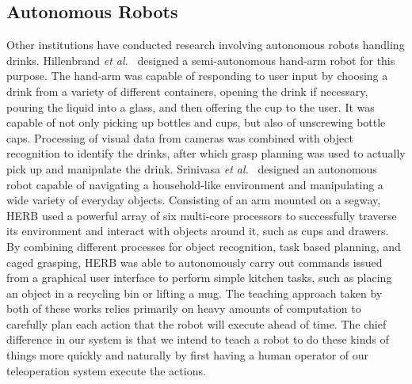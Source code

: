 \documentclass{sig-alternate}
\begin{document}
\subsection{Autonomous Robots}
Other institutions have conducted research involving autonomous robots handling
drinks. Hillenbrand \textit{et al.}~\cite{pouring_arm} designed a 
semi-autonomous hand-arm robot for this purpose. The hand-arm was capable of 
responding to user input by choosing a drink from a variety of different 
containers, opening the drink if necessary, pouring the liquid into a glass, 
and then offering the cup to the user. It was capable of not only picking up 
bottles and cups, but also of unscrewing bottle caps. Processing of visual data
from cameras was combined with object recognition to identify the drinks, after
which grasp planning was used to actually pick up and manipulate the drink. 
Srinivasa \textit{et al.}~\cite{herb} designed an autonomous robot capable of 
navigating a household-like environment and manipulating a wide variety of 
everyday objects. Consisting of an arm mounted on a segway, HERB used a 
powerful array of six multi-core processors to successfully traverse its 
environment and interact with objects around it, such as cups and drawers. By 
combining different processes for object recognition, task based planning, and 
caged grasping, HERB was able to autonomously carry out commands issued from a 
graphical user interface to perform simple kitchen tasks, such as placing an 
object in a recycling bin or lifting a mug. The teaching approach taken by both
of these works relies primarily on heavy amounts of computation to carefully 
plan each action that the robot will execute ahead of time.  The chief 
difference in our system is that we intend to teach a robot to do these kinds
of things more quickly and naturally by first having a human operator of our 
teleoperation system execute the actions.
\end{document}
